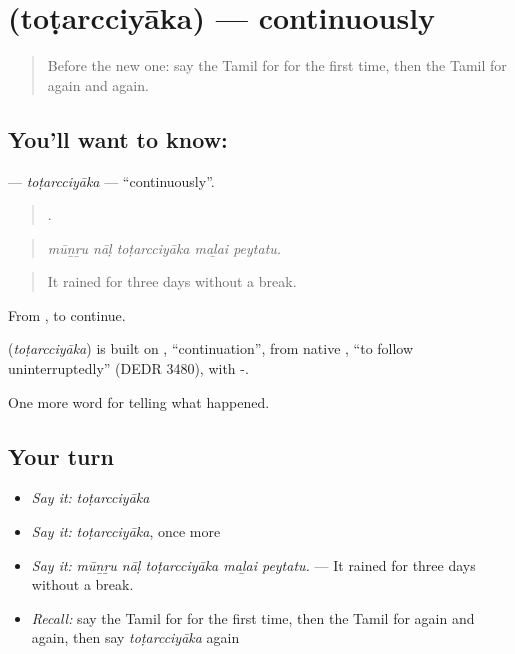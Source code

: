 \section[\texorpdfstring{\ta{தொடர்ச்சியாக} (toṭarcciyāka)}{தொடர்ச்சியாக (toṭarcciyāka)}]{ (toṭarcciyāka) — continuously}

\label{lesson:TA-C317-totarcciyaka}



\begin{quote}
Before the new one: say the Tamil for for the first time, then the Tamil for again and again.
\end{quote}

\subsection*{You'll want to know: }
\textbf{} — \emph{toṭarcciyāka} — \textquotedblleft{}continuously\textquotedblright{}.

\begin{quote}
    .
\end{quote}

\begin{quote}
\emph{mūṉṟu nāḷ toṭarcciyāka maḻai peytatu.}
\end{quote}

\begin{quote}
It rained for three days without a break.
\end{quote}

From , to continue.

\begin{cousinweb}
\textbf{} (\emph{toṭarcciyāka}) is built on , \textquotedblleft{}continuation\textquotedblright{}, from native , \textquotedblleft{}to follow uninterruptedly\textquotedblright{} (DEDR 3480), with -.
\end{cousinweb}

\begin{grammarlens}[title={What you've built}]
One more word for telling what happened.
\end{grammarlens}

\subsection*{Your turn}
\begin{itemize}
\raggedright
  \item \emph{Say it:} \emph{toṭarcciyāka}
  \item \emph{Say it:} \emph{toṭarcciyāka}, once more
  \item \emph{Say it:} \emph{mūṉṟu nāḷ toṭarcciyāka maḻai peytatu.} — It rained for three days without a break.
  \item \emph{Recall:} say the Tamil for for the first time, then the Tamil for again and again, then say \emph{toṭarcciyāka} again
\end{itemize}

